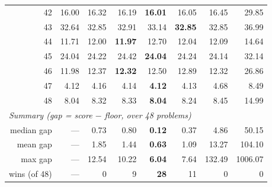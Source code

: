 \begin{table}[t]
\begin{tabular}{r r r r r r r r}
42 & 16.00  & 16.32           & 16.19           & \textbf{16.01}  & 16.05   & 16.45   & 29.85  \\
43 & 32.64  & 32.85           & 32.91           & 33.14   & \textbf{32.85}  & 32.85   & 36.99  \\
44 & 11.71  & 12.00           & \textbf{11.97}  & 12.70   & 12.04   & 12.09   & 14.64  \\
45 & 24.04  & 24.22           & 24.42           & \textbf{24.04}  & 24.24   & 24.14   & 32.14  \\
46 & 11.98  & 12.37           & \textbf{12.32}  & 12.50   & 12.89   & 12.32   & 26.86  \\
47 & 4.12   & 4.16            & 4.14            & \textbf{4.12}   & 4.13    & 4.68    & 8.49   \\
48 & 8.04   & 8.32            & 8.33            & \textbf{8.04}   & 8.24    & 8.45    & 14.99  \\
\midrule
\multicolumn{8}{l}{\emph{Summary (gap = score $-$ floor, over 48 problems)}} \\
median gap   & --- & 0.73  & 0.80  & \textbf{0.12} & 0.37  & 4.86   & 50.15 \\
mean gap     & --- & 1.85  & 1.44  & \textbf{0.63} & 1.09  & 13.27  & 104.10 \\
max gap      & --- & 12.54 & 10.22 & \textbf{6.04} & 7.64  & 132.49 & 1006.07 \\
wins (of 48) & --- & 0     & 9     & \textbf{28}   & 11    & 0      & 0    \\
\bottomrule
\end{tabular}
\end{table}


